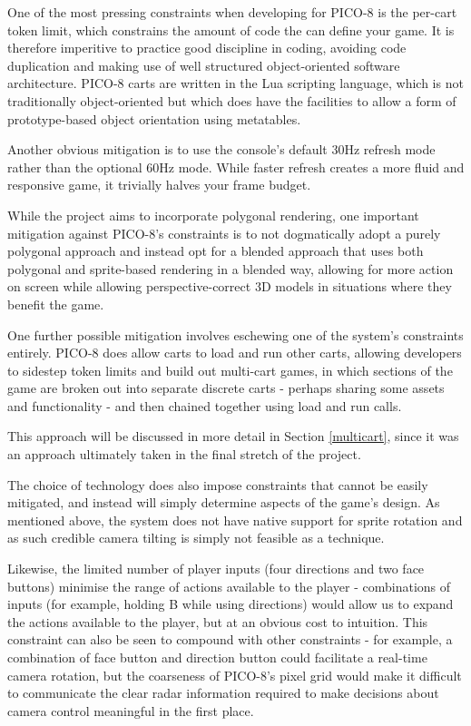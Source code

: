 \documentclass[11pt]{article}
\begin{document}
One of the most pressing constraints when developing for PICO-8 is the per-cart token
limit, which constrains the amount of code the can define your game. It is therefore
imperitive to practice good discipline in coding, avoiding code duplication and making use
of well structured object-oriented software architecture. PICO-8 carts are written in the
Lua scripting language, which is not traditionally object-oriented but which does have the
facilities to allow a form of prototype-based object orientation using metatables.


Another obvious mitigation is to use the console's default 30Hz refresh mode rather than
the optional 60Hz mode. While faster refresh creates a more fluid and responsive game,
it trivially halves your frame budget.


While the project aims to incorporate polygonal rendering, one important mitigation against
PICO-8's constraints is to not dogmatically adopt a purely polygonal approach and instead
opt for a blended approach that uses both polygonal and sprite-based rendering in a
blended way, allowing for more action on screen while allowing perspective-correct 3D models
in situations where they benefit the game.


One further possible mitigation involves eschewing one of the system's constraints entirely.
PICO-8 does allow carts to load and run other carts, allowing developers to sidestep token
limits and build out multi-cart games, in which sections of the game are broken out into
separate discrete carts - perhaps sharing some assets and functionality - and then chained
together using load and run calls.

This approach will be discussed in more detail in Section \ref{multicart}, since it was an
approach ultimately taken in the final stretch of the project.


The choice of technology does also impose constraints that cannot be easily mitigated, and
instead will simply determine aspects of the game's design. As mentioned above, the system
does not have native support for sprite rotation and as such credible camera tilting is simply
not feasible as a technique.

Likewise, the limited number of player inputs (four directions and
two face buttons) minimise the range of actions available to the player - combinations of inputs
(for example, holding B while using directions) would allow us to expand the actions available
to the player, but at an obvious cost to intuition. This constraint can also be seen to
compound with other constraints - for example, a combination of face button and direction
button could facilitate a real-time camera rotation, but the coarseness of PICO-8's pixel
grid would make it difficult to communicate the clear radar information required to
make decisions about camera control meaningful in the first place.
\end{document}
